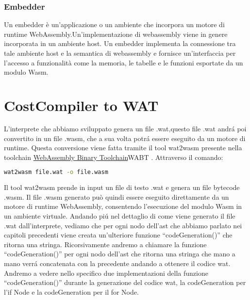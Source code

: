 \documentclass[../../main.tex]{subfiles}
\begin{document}
\subsubsection{Embedder}
Un embedder è un'applicazione o un ambiente che incorpora un motore di runtime WebAssembly.Un'implementazione di webassembly viene in genere incorporata in un ambiente host.
Un embedder implementa la connessione tra tale ambiente host e la semantica di webassembly e fornisce un'interfaccia per l'accesso a funzionalità come la memoria, le tabelle e le funzioni esportate da un modulo Wasm.\autocite{amslaurea20464}\autocite{DBLP:journals/corr/abs-2205-01183}

\section{CostCompiler to WAT}
L'interprete che abbiamo sviluppato genera un file .wat,questo file .wat andrá poi convertito in un file .wasm, che a sua volta potrá essere eseguito da un motore di runtime.
Questa conversione viene fatta tramite il tool wat2wasm presente nella toolchain \href{https://github.com/WebAssembly/wabt}{WebAssembly Binary Toolchain}{WABT} \autocite{jain2022webassembly}.
Attraverso il comando:
\begin{lstlisting}[language=bash]
    wat2wasm file.wat -o file.wasm
\end{lstlisting}
Il tool wat2wasm prende in input un file di testo .wat e genera un file bytecode .wasm. Il file .wasm generato può quindi essere eseguito direttamente da un motore di runtime WebAssembly, consentendo l'esecuzione del modulo Wasm in un ambiente virtuale.
Andando piú nel dettaglio di come viene generato il file .wat dall'interprete, vediamo che per ogni nodo dell'ast che abbiamo parlato nei capitoli precedenti viene creata un'ulteriore funzione ``codeGeneration()'' che ritorna una stringa.
Ricorsivamente andremo a chiamare la funzione ``codeGeneration()'' per ogni nodo dell'ast che ritorna una stringa che mano a mano verrá concatenata con la precedente andando a ottenere il codice wat.
Andremo a vedere nello specifico due implementazioni della funzione ``codeGeneration()'' durante la generazione del codice wat, la codeGeneration per l'if Node e la codeGeneration per il for Node.
\end{document}
